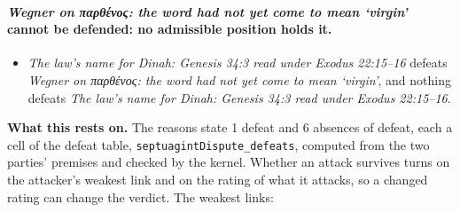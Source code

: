 \documentclass[11pt]{article}
\begin{document}
\paragraph{\emph{Wegner on παρθένος: the word had not yet come to mean ‘virgin’} cannot be defended: no admissible position holds it.}
\begin{itemize}
\item \emph{The law’s name for Dinah: Genesis 34:3 read under Exodus 22:15–16} defeats \emph{Wegner on παρθένος: the word had not yet come to mean ‘virgin’}, and nothing defeats \emph{The law’s name for Dinah: Genesis 34:3 read under Exodus 22:15–16}.
\end{itemize}
\par\noindent\textbf{What this rests on.} The reasons state 1 defeat and 6 absences of defeat, each a cell of the defeat table, \texttt{septuagint\allowbreak{}Dispute\_\allowbreak{}defeats}, computed from the two parties' premises and checked by the kernel. Whether an attack survives turns on the attacker's weakest link and on the rating of what it attacks, so a changed rating can change the verdict. The weakest links:
\end{document}
